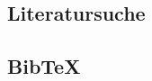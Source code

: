 \documentclass[deutsch]{llncs}
\begin{document}
\subsection{Literatursuche}
\label{subsec:search}


\subsection{BibTeX}
\label{subsec:bibtex}


\printbibliography
\end{document}
